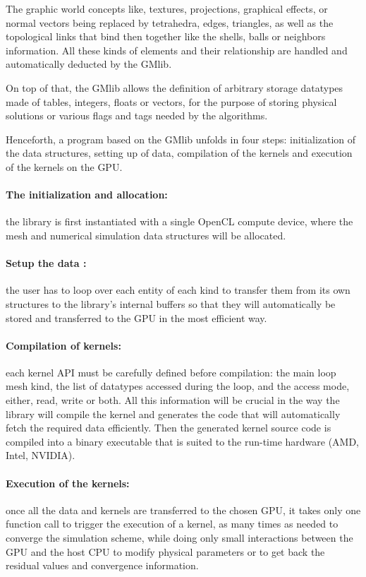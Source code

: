 \documentclass[a4paper,12pt]{article}
\begin{document}
The graphic world concepts like, textures, projections, graphical effects, or normal vectors being replaced by tetrahedra, edges, triangles, as well as the topological links that bind then together like the shells, balls or neighbors information. All these kinds of elements and their relationship are handled and automatically deducted by the GMlib.

On top of that, the GMlib allows the definition of arbitrary storage datatypes made of tables, integers, floats or vectors, for the purpose of storing physical solutions or various flags and tags needed by the algorithms.

Henceforth, a program based on the GMlib unfolds in four steps: initialization of the data structures, setting up of data, compilation of the kernels and execution of the kernels on the GPU.

\paragraph{The initialization and allocation:} the library is first instantiated with a single OpenCL compute device, where the mesh and numerical simulation data structures will be allocated.

\paragraph{Setup the data :} the user has to loop over each entity of each kind to transfer them from its own structures to the library's internal buffers so that they will automatically be stored and transferred to the GPU in the most efficient way.

\paragraph{Compilation of kernels:} each kernel API must be carefully defined before compilation: the main loop mesh kind, the list of datatypes accessed during the loop, and the access mode, either, read, write or both. All this information will be crucial in the way the library will compile the kernel and generates the code that will automatically fetch the required data efficiently. Then the generated kernel source code is compiled into a binary executable that is suited to the run-time hardware (AMD, Intel, NVIDIA).

\paragraph{Execution of the kernels:} once all the data and kernels are transferred to the chosen GPU, it takes only one function call to trigger the execution of a kernel, as many times as needed to converge the simulation scheme, while doing only small interactions between the GPU and the host CPU to modify physical parameters or to get back the residual values and convergence information.
\end{document}
